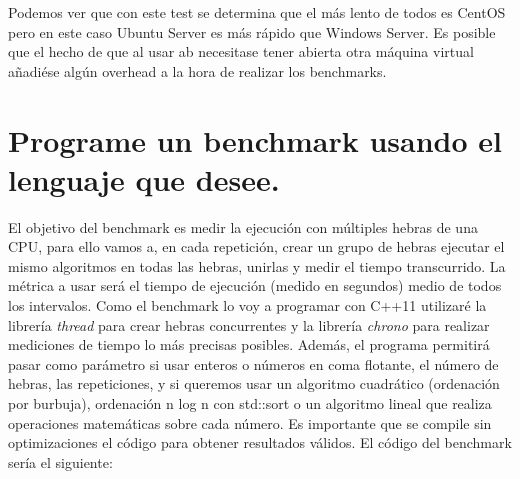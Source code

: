 Podemos ver que con este test se determina que el más lento de todos es CentOS pero en este caso Ubuntu Server es más rápido que Windows Server. Es posible que el hecho de que al usar ab necesitase tener abierta otra máquina virtual añadiése algún overhead a la hora de realizar los benchmarks.

\section{Programe un benchmark usando el lenguaje que desee.}
El objetivo del benchmark es medir la ejecución con múltiples hebras de una CPU, para ello vamos a, en cada repetición, crear un grupo de hebras ejecutar el mismo algoritmos en todas las hebras, unirlas y medir el tiempo transcurrido. La métrica a usar será el tiempo de ejecución (medido en segundos) medio de todos los intervalos. Como el benchmark lo voy a programar con C++11 utilizaré la librería \textit{thread} \cite{c5a} para crear hebras concurrentes y la librería \textit{chrono} \cite{c5b} para realizar mediciones de tiempo lo más precisas posibles. Además, el programa permitirá pasar como parámetro si usar enteros o números en coma flotante, el número de hebras, las repeticiones, y si queremos usar un algoritmo cuadrático (ordenación por burbuja), ordenación n log n con std::sort o un algoritmo lineal que realiza operaciones matemáticas sobre cada número. Es importante que se compile sin optimizaciones el código para obtener resultados válidos. El código del benchmark sería el siguiente:

